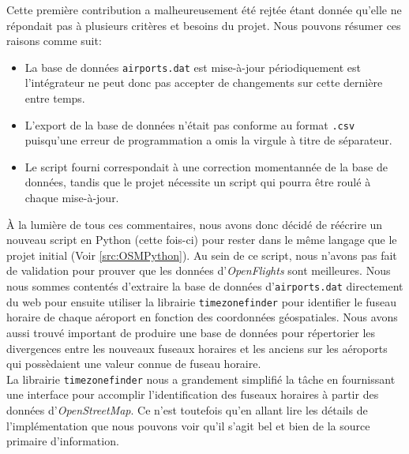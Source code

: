 Cette première contribution a malheureusement été rejtée étant donnée qu'elle ne répondait pas à plusieurs critères et besoins du projet. Nous pouvons résumer ces raisons comme suit: \\
\begin{itemize}
	\item La base de données \texttt{airports.dat} est mise-à-jour périodiquement est l'intégrateur ne peut donc pas accepter de changements sur cette dernière entre temps.
	\item L'export de la base de données n'était pas conforme au format \texttt{.csv} puisqu'une erreur de programmation a omis la virgule à titre de séparateur.
	\item Le script fourni correspondait à une correction momentannée de la base de données, tandis que le projet nécessite un script qui pourra être roulé à chaque mise-à-jour.
\end{itemize}
\vspace{\baselineskip}

À la lumière de tous ces commentaires, nous avons donc décidé de réécrire un nouveau script en Python (cette fois-ci) pour rester dans le même langage que le projet initial (Voir \autoref{src:OSMPython}). Au sein de ce script, nous n'avons pas fait de validation pour prouver que les données d'\emph{OpenFlights} sont meilleures. Nous nous sommes contentés d'extraire la base de données d'\texttt{airports.dat} directement du web pour ensuite utiliser la librairie \texttt{timezonefinder} pour identifier le fuseau horaire de chaque aéroport en fonction des coordonnées géospatiales. Nous avons aussi trouvé important de produire une base de données pour répertorier les divergences entre les nouveaux fuseaux horaires et les anciens sur les aéroports qui possèdaient une valeur connue de fuseau horaire. \\

La librairie \texttt{timezonefinder} nous a grandement simplifié la tâche en fournissant une interface pour accomplir l'identification des fuseaux horaires à partir des données d'\emph{OpenStreetMap}. Ce n'est toutefois qu'en allant lire les détails de l'implémentation que nous pouvons voir qu'il s'agit bel et bien de la source primaire d'information. \cite{timezonefinder} \\

